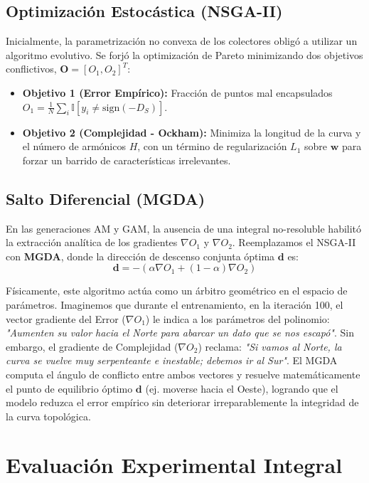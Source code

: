 \documentclass[10pt,twocolumn,letterpaper]{article}
\begin{document}
\subsection{Optimización Estocástica (NSGA-II)}
Inicialmente, la parametrización no convexa de los colectores obligó a utilizar un algoritmo evolutivo. Se forjó la optimización de Pareto minimizando dos objetivos conflictivos, $\mathbf{O} = [O_1, O_2]^T$:
\begin{itemize}
    \item \textbf{Objetivo 1 (Error Empírico):} Fracción de puntos mal encapsulados $O_1 = \frac{1}{N} \sum_i \mathbb{I} [ y_i \neq \text{sign}(-D_S) ]$.
    \item \textbf{Objetivo 2 (Complejidad - Ockham):} Minimiza la longitud de la curva y el número de armónicos $H$, con un término de regularización $L_1$ sobre $\mathbf{w}$ para forzar un barrido de características irrelevantes.
\end{itemize}

\subsection{Salto Diferencial (MGDA)}
En las generaciones AM y GAM, la ausencia de una integral no-resoluble habilitó la extracción analítica de los gradientes $\nabla O_1$ y $\nabla O_2$. Reemplazamos el NSGA-II con \textbf{MGDA}, donde la dirección de descenso conjunta óptima $\mathbf{d}$ es:
\begin{equation}
    \mathbf{d} = -\left( \alpha \nabla O_1 + (1-\alpha) \nabla O_2 \right)
\end{equation}

Físicamente, este algoritmo actúa como un árbitro geométrico en el espacio de parámetros. Imaginemos que durante el entrenamiento, en la iteración 100, el vector gradiente del Error ($\nabla O_1$) le indica a los parámetros del polinomio: \textit{"Aumenten su valor hacia el Norte para abarcar un dato que se nos escapó"}. Sin embargo, el gradiente de Complejidad ($\nabla O_2$) reclama: \textit{"Si vamos al Norte, la curva se vuelve muy serpenteante e inestable; debemos ir al Sur"}. El MGDA computa el ángulo de conflicto entre ambos vectores y resuelve matemáticamente el punto de equilibrio óptimo $\mathbf{d}$ (ej. moverse hacia el Oeste), logrando que el modelo reduzca el error empírico sin deteriorar irreparablemente la integridad de la curva topológica.

\section{Evaluación Experimental Integral}
\end{document}
